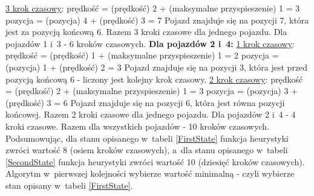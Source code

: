 \newline
\underline{3 krok czasowy}:
\newline
\newline
prędkość = (prędkość) 2 + (maksymalne przyspieszenie) 1 = 3
\newline
pozycja = (pozycja) 4 + (prędkość) 3 = 7
\newline
\newline
Pojazd znajduje się na pozycji 7, która jest za pozycją końcową 6.
\newline
\newline
Razem 3 kroki czasowe dla jednego pojazdu. Dla pojazdów 1 i~3 - 6 kroków czasowych.
\newline
\newline
\textbf{Dla pojazdów 2 i~4:}
\newline
\newline
\underline{1 krok czasowy}:
\newline
\newline
prędkość = (prędkość) 1 + (maksymalne przyspieszenie) 1 = 2
\newline
pozycja = (pozycja) 1 + (prędkość) 2 = 3
\newline
\newline
Pojazd znajduje się na pozycji 3, która jest przed pozycją końcową 6 - liczony jest kolejny krok czasowy.
\newline
\newline
\underline{2 krok czasowy}:
\newline
\newline
prędkość = (prędkość) 2 + (maksymalne przyspieszenie) 1 = 3
\newline
pozycja = (pozycja) 3 + (prędkość) 3 = 6
\newline
\newline
Pojazd znajduje się na pozycji 6, która jest równa pozycji końcowej.
\newline
\newline
Razem 2 kroki czasowe dla jednego pojazdu. Dla pojazdów 2 i~4 - 4 kroki czasowe.
\newline
\newline
Razem dla wszystkich pojazdów - 10 kroków czasowych.
\newline
\newline
\newline
Podsumowując, dla stanu opisanego w~tabeli \ref{FirstState} funkcja heurystyki zwróci wartość 8 (osiem kroków czasowych), a~dla stanu opisanego w~tabeli \ref{SecondState} funkcja heurystyki zwróci wartość 10 (dziesięć kroków czasowych). Algorytm w~pierwszej kolejności wybierze wartość minimalną - czyli wybierze stan opisany w~tabeli \ref{FirstState}.

